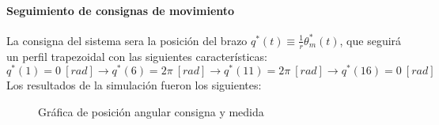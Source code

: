 \documentclass[a4paper, 10pt, onecolumn,journal]{ieeeconf}
\begin{document}
\paragraph{\textbf{Seguimiento de consignas de movimiento}}
La consigna del sistema sera la posición del brazo ${q^*}(t) \equiv \frac{1}{r} {\theta^*_m}(t)$, que seguirá un perfil trapezoidal con las siguientes características:
\begin{equation}
	{q^*}(1)=0 \: [rad] \longrightarrow {q^*}(6)=2 \pi \: [rad] \longrightarrow {q^*}(11)=2 \pi \: [rad]\longrightarrow {q^*}(16)=0 \: [rad]
\end{equation}
Los resultados de la simulación fueron los siguientes:

\begin{figure}[H]
	\centering
	\begin{adjustbox}{max width=\columnwidth}
	\end{adjustbox}
	\caption{Gráfica de posición angular consigna y medida}
	\label{Grafica de posicion angular consigna y medida }
\end{figure}
\end{document}
